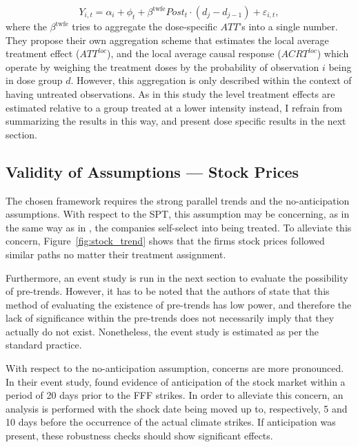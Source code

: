 \documentclass[12pt]{article}
\begin{document}
\begin{equation}
    Y_{i,t} = \alpha_i + \phi_t +  \beta^{\text{twfe}} Post_t \cdot (d_j - d_{j-1}) + \varepsilon_{i,t},
\end{equation}
where the $\beta^{\text{twfe}}$ tries to aggregate the dose-specific $ATT$'s into a single number. They propose their own aggregation scheme that estimates the local average treatment effect ($ATT^{loc}$), and the local average causal response ($ACRT^{loc}$) which operate by weighing the treatment doses by the probability of observation $i$ being in dose group $d$. However, this aggregation is only described within the context of having untreated observations. As in this study the level treatment effects are estimated relative to a group treated at a lower intensity instead, I refrain from summarizing the results in this way, and present dose specific results in the next section.


\subsection{Validity of Assumptions --- Stock Prices}

The chosen framework requires the strong parallel trends and the no-anticipation assumptions. With respect to the SPT, this assumption may be concerning, as in the same way as in \textcite{koenigImpulsePurchasesGun2023}, the companies self-select into being treated. To alleviate this concern, Figure~\ref{fig:stock_trend} shows that the firms stock prices followed similar paths no matter their treatment assignment.

Furthermore, an event study is run in the next section to evaluate the possibility of pre-trends. However, it has to be noted that the authors of \textcite{callawayDifferenceinDifferencesContinuousTreatment2025} state that this method of evaluating the existence of pre-trends has low power, and therefore the lack of significance within the pre-trends does not necessarily imply that they actually do not exist. Nonetheless, the event study is estimated as per the standard practice.

With respect to the no-anticipation assumption, concerns are more pronounced. In their event study, \textcite{schusterStockPriceReactions2023} found evidence of anticipation of the stock market within a period of 20 days prior to the FFF strikes. In order to alleviate this concern, an analysis is performed with the shock date being moved up to, respectively, 5 and 10 days before the occurrence of the actual climate strikes. If anticipation was present, these robustness checks should show significant effects. 
\end{document}
